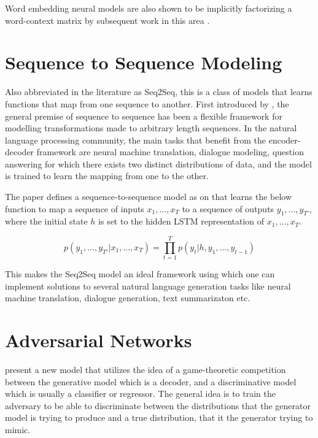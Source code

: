 Word embedding neural models are also shown to be implicitly factorizing a word-context matrix by subsequent work in this area \citep{levy2014neural}.


\section{Sequence to Sequence Modeling}

Also abbreviated in the literature as Seq2Seq, this is a class of models that learns functions that map from one sequence to another. First introduced by \cite{sutskever2014sequence}, the general premise of sequence to sequence has been a flexible framework for modelling transformations made to arbitrary length sequences. In the natural language processing community, the main tasks that benefit from the encoder-decoder framework are neural machine translation, dialogue modeling, question answering for which there exists two distinct distributions of data, and the model is trained to learn the mapping from one to the other.

The paper defines a sequence-to-sequence model as on that learns the below function to map a sequence of inputs $x_1, ... , x_T$ to a sequence of outputs $y_1, ... , y_{T′}$, where the initial state $h$ is set to the hidden LSTM representation of $x_1, ... , x_T$.

\begin{equation}
	p(y_1, ... , y_{T′} | x_1, ... , x_T) =	\prod_{t=1}^T p(y_t | h, y_1, ... , y_{t−1})
\end{equation}

This makes the Seq2Seq model an ideal framework using which one can implement solutions to several natural language generation tasks like neural machine translation, dialogue generation, text summarizaton etc.

\section{Adversarial Networks}

\cite{goodfellow2014generative} present a new model that utilizes the idea of a game-theoretic competition between the generative model which is a decoder, and a discriminative model which is usually a classifier or regressor. The general idea is to train the adversary to be able to discriminate between the distributions that the generator model is trying to produce and a true distribution, that it the generator trying to mimic.

